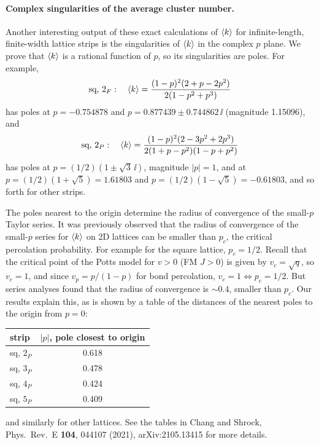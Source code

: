 \paragraph{Complex singularities of the average cluster number.}

Another interesting output of these exact calculations of $\langle k\rangle$ for infinite-length, finite-width lattice strips is the
singularities of $\langle k\rangle$ in the complex $p$ plane. We prove that $\langle k\rangle$ is a rational function of $p$, so its
singularities are poles. For example,
\begin{equation}
  \text{sq, }2_F:\quad \langle k\rangle = \frac{(1-p)^2(2+p-2p^2)}{2(1-p^2+p^3)}
\end{equation}
has poles at $p = -0.754878$ and $p = 0.877439\pm 0.744862\,\ii$ (magnitude 1.15096), and
\begin{equation}
  \text{sq, }2_P:\quad \langle k\rangle = \frac{(1-p)^2(2-3p^2+2p^3)}{2(1+p-p^2)(1-p+p^2)}
\end{equation}
has poles at $p = (1/2)(1\pm\sqrt3\,\ii)$, magnitude $|p| = 1$, and at
$p = (1/2)(1+\sqrt5) = 1.61803$ and $p = (1/2)(1-\sqrt5) = -0.61803$, and so forth for other strips.

The poles nearest to the origin determine the radius of convergence of the small-$p$ Taylor series. It was previously
observed that the radius of convergence of the small-$p$ series for $\langle k\rangle$ on 2D lattices can be smaller than $p_c$, the
critical percolation probability. For example for the square lattice, $p_c = 1/2$. Recall that the critical point of the
Potts model for $v>0$ (FM $J>0$) is given by $v_c = \sqrt q$, so $v_c = 1$, and since $v_p = p/(1-p)$ for bond
percolation, $v_c = 1\Leftrightarrow p_c = 1/2$. But series analyses found that the radius of convergence is $\sim 0.4$,
smaller than $p_c$. Our results explain this, as is shown by a table of the distances of the nearest poles to the origin
from $p = 0$:
\begin{center}
\begin{tabular}{lc}
  strip & $|p|$, pole closest to origin\\ \hline
  sq, $2_P$ & 0.618\\
  sq, $3_P$ & 0.478\\
  sq, $4_P$ & 0.424\\
  sq, $5_P$ & 0.409
\end{tabular}
\end{center}
and similarly for other lattices. See the tables in Chang and Shrock, Phys.\ Rev.\ E \textbf{104}, 044107 (2021),
arXiv:2105.13415 for more details.

